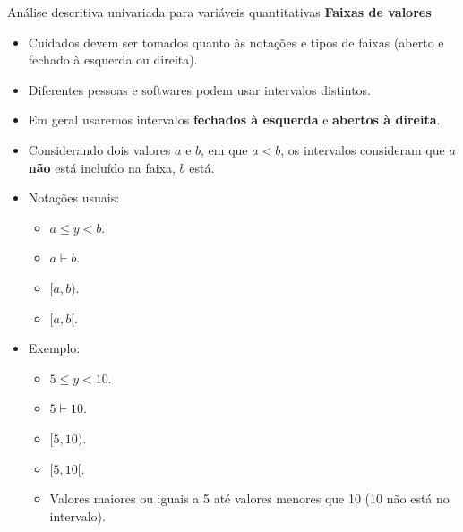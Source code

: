 \documentclass[
  ignorenonframetext,
  serif,
  professionalfont,
  usenames,
  dvipsnames,
  aspectratio = 169]{beamer}
\providecommand{\tightlist}{%
  \setlength{\itemsep}{0pt}\setlength{\parskip}{0pt}}
\renewcommand{\tightlist}{%
  \setlength{\itemsep}{0\baselineskip}
  \setlength{\parskip}{0.25\baselineskip}
}
\def\beginAHalfColumn{\begin{minipage}{0.49\textwidth}}%
\def\endColumns{\end{minipage}}%
\begin{document}
\begin{frame}{Análise descritiva univariada para variáveis
quantitativas}
\label{anuxe1lise-descritiva-univariada-para-variuxe1veis-quantitativas-3}
\textbf{Faixas de valores}

\beginAHalfColumn

\begin{itemize}
\tightlist
\item
  Cuidados devem ser tomados quanto às notações e tipos de faixas
  (aberto e fechado à esquerda ou direita).
\end{itemize}

\vspace{0.5cm}

\begin{itemize}
\tightlist
\item
  Diferentes pessoas e softwares podem usar intervalos distintos.
\end{itemize}

\vspace{0.5cm}

\begin{itemize}
\tightlist
\item
  Em geral usaremos intervalos \textbf{fechados à esquerda} e
  \textbf{abertos à direita}.
\end{itemize}

\vspace{0.5cm}

\begin{itemize}
\tightlist
\item
  Considerando dois valores \(a\) e \(b\), em que \(a < b\), os
  intervalos consideram que \(a\) \textbf{não} está incluído na faixa,
  \(b\) está.
\end{itemize}

\endColumns
\beginAHalfColumn

\begin{itemize}
\tightlist
\item
  Notações usuais:

  \begin{itemize}
  \tightlist
  \item
    \(a \leq y < b\).
  \item
    \(a \vdash b\).
  \item
    \([a,b)\).
  \item
    \([a,b[\).
  \end{itemize}
\item
  Exemplo:

  \begin{itemize}
  \tightlist
  \item
    \(5 \leq y < 10\).
  \item
    \(5 \vdash 10\).
  \item
    \([5,10)\).
  \item
    \([5,10[\).
  \item
    Valores maiores ou iguais a 5 até valores menores que 10 (10 não
    está no intervalo).
  \end{itemize}
\end{itemize}

\endColumns
\end{frame}
\end{document}
